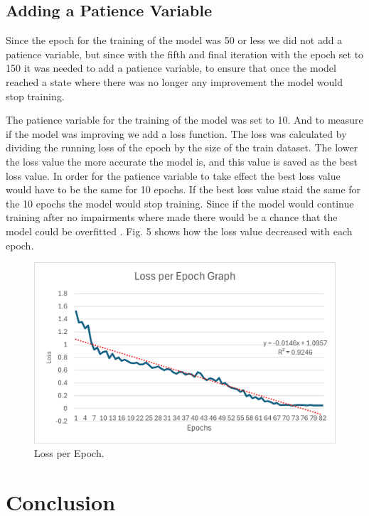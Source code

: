 \documentclass[conference]{IEEEtran}
\begin{document}
\subsection{Adding a Patience Variable}

Since the epoch for the training of the model was 50 or less we did not add a patience variable, but since with the fifth and final iteration with the epoch set to 150 it was needed to add a patience variable, to ensure that once the model reached a state where there was no longer any improvement the model would stop training.

The patience variable for the training of the model was set to 10. And to measure if the model was improving we add a loss function. The loss was calculated by dividing the running loss of the epoch by the size of the train dataset. The lower the loss value the more accurate the model is, and this value is saved as the best loss value. In order for the patience variable to take effect the best loss value would have to be the same for 10 epochs. If the best loss value staid the same for the 10 epochs the model would stop training. Since if the model would continue training after no impairments where made there would be a chance that the model could be overfitted \cite{b5}. Fig. 5 shows how the loss value decreased with each epoch.

\begin{figure}[h]
    \centering
    \includegraphics[width=\linewidth]{Loss_per_Epoch_Graph.png}
    \caption{Loss per Epoch.}
    \label{fig 3}
\end{figure}

\section{Conclusion}
\end{document}
